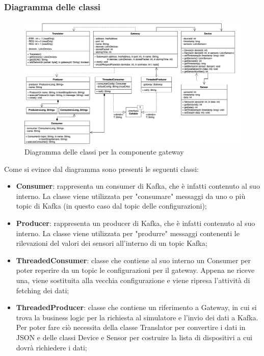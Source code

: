 	\begin{landscape}
		\subsubsection{Diagramma delle classi}%
		  	\begin{figure}[H]
				\centering
				\includegraphics[scale=0.499]{res/images/GATEWAY/ClassiGateway.png}
				\caption{Diagramma delle classi per la componente gateway}
				\label{Diagramma 2}
			\end{figure}
	Come si evince dal diagramma sono presenti le seguenti classi:
	\begin{itemize}
		\item \textbf{Consumer}: rappresenta un consumer di Kafka, che è infatti contenuto al suo interno. La classe viene utilizzata per "consumare" messaggi da uno o più topic di Kafka (in questo caso dal topic delle configurazioni); 
		\item \textbf{Producer}: rappresenta un producer di Kafka, che è infatti contenuto al suo interno. La classe viene utilizzata per "produrre" messaggi contenenti le rilevazioni del valori dei sensori all'interno di un topic Kafka;
		\item \textbf{ThreadedConsumer}: classe che contiene al suo interno un Consumer per poter reperire da un topic  le configurazioni per il gateway. Appena ne riceve una, viene sostituita alla vecchia configurazione e viene ripresa l'attività di fetching dei dati;
		\item \textbf{ThreadedProducer}: classe che contiene un riferimento a Gateway, in cui si trova la business logic per la richiesta al simulatore e l'invio dei dati a Kafka. Per poter fare ciò necessita della classe Translator per convertire i dati in JSON e delle classi Device e Sensor per costruire la lista di dispositivi a cui dovrà richiedere i dati;

\end{itemize}
\end{landscape}
